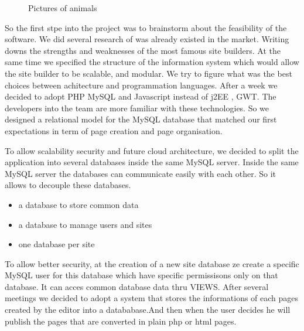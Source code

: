 \begin{figure}
  \centering
  \hspace{10pt}               
  \caption{Pictures of animals}
  \label{fig:animals}
\end{figure}

So the first stpe into the project was to brainstorm about the feasibility of the software. We did several research of was already existed in the market.
Writing downs the strengths and weaknesses of the most famous site builders. At the same time we specified the structure of the information system which
would allow the site builder to be scalable, and modular. We try to figure what was the best choices between achitecture and programmation languages.
After a week we decided to adopt PHP MySQL and Javascript instead of j2EE , GWT. The developers into the team are more familiar with these technologies.
So we designed a relational model for the MySQL database that matched our first expectations in term of page creation and page organisation.



To allow scalability security and future cloud architecture, we decided to split the application into several databases inside the same MySQL server.
Inside the same MySQL server the databases can communicate easily with each other. So it allows to decouple these databases.
\begin{itemize}
\item a database to store common data
\item a database to manage users and sites
\item one database per site 
\end{itemize}
To allow better security, at the creation of a new site database ze create a specific MySQL user for this database which have specific permissisons
only on that database. It can acces common database data thru VIEWS.
After several meetings we decided to adopt a system that stores the informations of each pages created by the editor into a datababase.And then when
the user decides he will publish the pages that are converted in plain php or html pages.

